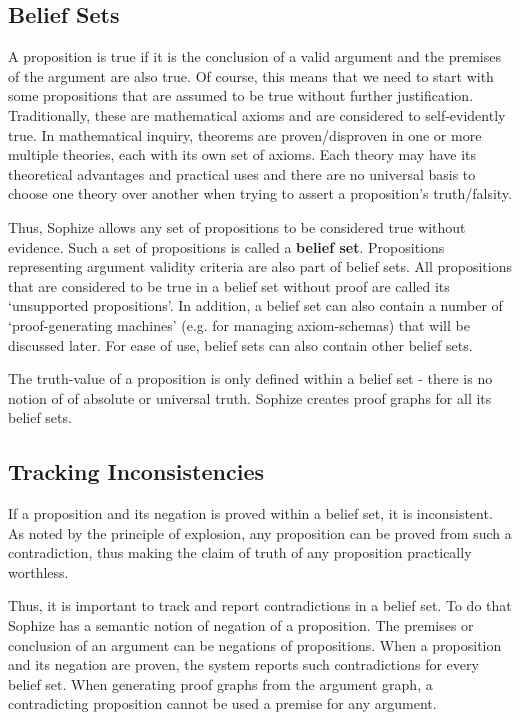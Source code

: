 \documentclass[a4paper]{article}
\begin{document}
\subsection{Belief Sets}
\label{sec:bset}

A proposition is true if it is the conclusion of a valid argument and the premises of the argument are also true. Of course, this means that we need to start with some propositions that are assumed to be true without further justification. Traditionally, these are mathematical axioms and are considered to self-evidently true. In mathematical inquiry, theorems are proven/disproven in one or more multiple theories, each with its own set of axioms. Each theory may have its theoretical advantages and practical uses and there are no universal basis to choose one theory over another when trying to assert a proposition's truth/falsity.

Thus, Sophize allows any set of propositions to be considered true without evidence. Such a set of propositions is called a \textbf{belief set}. Propositions representing argument validity criteria are also part of belief sets. All propositions that are considered to be true in a belief set without proof are called its `unsupported propositions'. In addition, a belief set can also contain a number of `proof-generating machines' (e.g. for managing axiom-schemas) that will be discussed later. For ease of use, belief sets can also contain other belief sets.

The truth-value of a proposition is only defined within a belief set - there is no notion of of absolute or universal truth. Sophize creates proof graphs for all its belief sets.

\subsection{Tracking Inconsistencies}
If a proposition and its negation is proved within a belief set, it is inconsistent. As noted by the principle of explosion, any proposition can be proved from such a contradiction, thus making the claim of truth of any proposition practically worthless.

Thus, it is important to track and report contradictions in a belief set. To do that Sophize has a semantic notion of negation of a proposition. The premises or conclusion of an argument can be negations of propositions. When a proposition and its negation are proven, the system reports such contradictions for every belief set. When generating proof graphs from the argument graph, a contradicting proposition cannot be used a premise for any argument.
\end{document}
